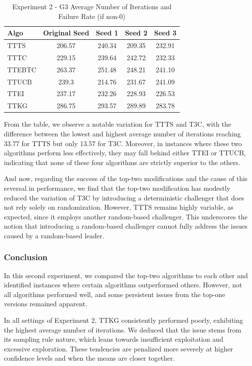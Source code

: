 \documentclass[a4paper, 12pt]{article}
\theoremstyle{definition}
\begin{document}
\begin{table}[hbt!]
\centering
\begin{tabular}{lcccc}
\hline
Algo & Original Seed & Seed 1 & Seed 2 & Seed 3 \\
\hline
TTTS & 206.57 & 240.34 & 209.35 & 232.91 \\
TTTC & 229.15 & 239.64 & 242.72 & 232.33 \\
TTEBTC & 263.37 & 251.48 & 248.21 & 241.10 \\
TTUCB & 239.3 & 214.76 & 231.67 & 241.09 \\
TTEI & 237.17 & 232.26 & 228.93 & 226.53 \\
TTKG & 286.75 & 293.57 & 289.89 & 283.78 \\
\hline
\end{tabular}
\caption{Experiment 2 - G3 Average Number of Iterations and Failure Rate (if non-0)}
\label{table:exp2_iter_g3}
\end{table}

From the table, we observe a notable variation for TTTS and T3C, with the difference between the lowest and highest average number of iterations reaching 33.77 for TTTS but only 13.57 for T3C. Moreover, in instances where these two algorithms perform less effectively, they may fall behind either TTEI or TTUCB, indicating that none of these four algorithms are strictly superior to the others.

And now, regarding the success of the top-two modifications and the cause of this reversal in performance, we find that the top-two modification has modestly reduced the variation of T3C by introducing a deterministic challenger that does not rely solely on randomization. However, TTTS remains highly variable, as expected, since it employs another random-based challenger. This underscores the notion that introducing a random-based challenger cannot fully address the issues caused by a random-based leader.

\subsubsection{Conclusion}
In this second experiment, we compared the top-two algorithms to each other and identified instances where certain algorithms outperformed others. However, not all algorithms performed well, and some persistent issues from the top-one versions remained apparent.

In all settings of Experiment 2, TTKG consistently performed poorly, exhibiting the highest average number of iterations. We deduced that the issue stems from its sampling rule nature, which leans towards insufficient exploitation and excessive exploration. These tendencies are penalized more severely at higher confidence levels and when the means are closer together.
\end{document}

